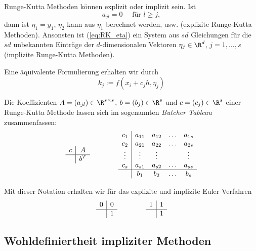 \documentclass[
]{mycourse}
\theoremstyle{mythm}
\theoremstyle{break}
\newcommand{\req}[1]{(\ref{eq:#1})}
\begin{document}
Runge-Kutta Methoden können explizit oder implizit sein. Ist
\[
a_{jl}=0 \quad \mbox{ für } l\geq j,
\]
dann ist $\eta_1=y_1$, $\eta_2$ kann aus $\eta_1$ berechnet werden, usw. (explizite Runge-Kutta Methoden).
Ansonsten ist \req{RK_eta} ein System aus $sd$ Gleichungen für die $sd$ unbekannten Einträge der $d$-dimensionalen Vektoren
$\eta_j\in \R^d$, $j=1,\ldots,s$ (implizite Runge-Kutta Methoden).

Eine äquivalente Formulierung erhalten wir durch
\[
k_j:=f(x_i+c_j h,\eta_j)
\]
\begin{alg}
	\begin{algorithmic}
	\end{algorithmic}
\end{alg}
Die Koeffizienten $A=(a_{jl})\in \R^{s\times s}$, $b=(b_j)\in \R^s$ und $c=(c_j)\in \R^s$
einer Runge-Kutta Methode lassen sich im sogenannten \emph{Butcher Tableau} zusammenfassen:
\[
\begin{array}{c | c}
c & A \\ \hline 
& b^T
\end{array} \qquad \qquad
%
\begin{array}{c | c c c c}
c_1 & a_{11} & a_{12} & \hdots & a_{1s}\\
c_2 & a_{21} & a_{22} & \ldots&  a_{2s}\\
\vdots & \vdots & \vdots & & \vdots\\
c_s & a_{s1} & a_{s2} & \hdots & a_{ss}\\ \hline
 & b_1 & b_2 & \hdots & b_s
\end{array}
\]

Mit dieser Notation erhalten wir für das explizite und implizite Euler Verfahren
\[
\begin{array}{c | c}
0 & 0 \\ \hline 
& 1
\end{array} \qquad \qquad
\begin{array}{c | c}
1 & 1 \\ \hline 
& 1
\end{array}
\]


\subsection{Wohldefiniertheit impliziter Methoden}
\end{document}
